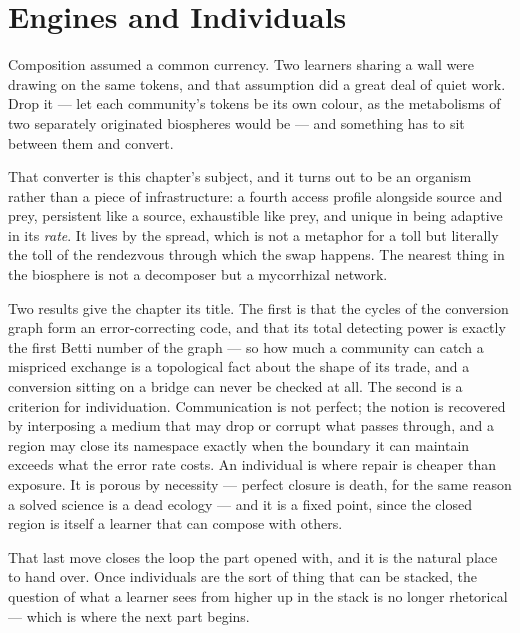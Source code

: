 \chapter{Engines and Individuals}
\label{ch:eng}

\noindent
Composition assumed a common currency. Two learners sharing a wall were
drawing on the same tokens, and that assumption did a great deal of quiet
work. Drop it --- let each community's tokens be its own colour, as the
metabolisms of two separately originated biospheres would be --- and
something has to sit between them and convert.

That converter is this chapter's subject, and it turns out to be an organism
rather than a piece of infrastructure: a fourth access profile alongside
source and prey, persistent like a source, exhaustible like prey, and unique
in being adaptive in its \emph{rate}. It lives by the spread, which is not a
metaphor for a toll but literally the toll of the rendezvous through which
the swap happens. The nearest thing in the biosphere is not a decomposer but
a mycorrhizal network.

Two results give the chapter its title. The first is that the cycles of the
conversion graph form an error-correcting code, and that its total detecting
power is exactly the first Betti number of the graph --- so how much a
community can catch a mispriced exchange is a topological fact about the
shape of its trade, and a conversion sitting on a bridge can never be
checked at all. The second is a criterion for individuation. Communication
is not perfect; the notion is recovered by interposing a medium that may
drop or corrupt what passes through, and a region may close its namespace
exactly when the boundary it can maintain exceeds what the error rate costs.
An individual is where repair is cheaper than exposure. It is porous by
necessity --- perfect closure is death, for the same reason a solved science
is a dead ecology --- and it is a fixed point, since the closed region is
itself a learner that can compose with others.

That last move closes the loop the part opened with, and it is the natural
place to hand over. Once individuals are the sort of thing that can be
stacked, the question of what a learner sees from higher up in the stack is
no longer rhetorical --- which is where the next part begins.


